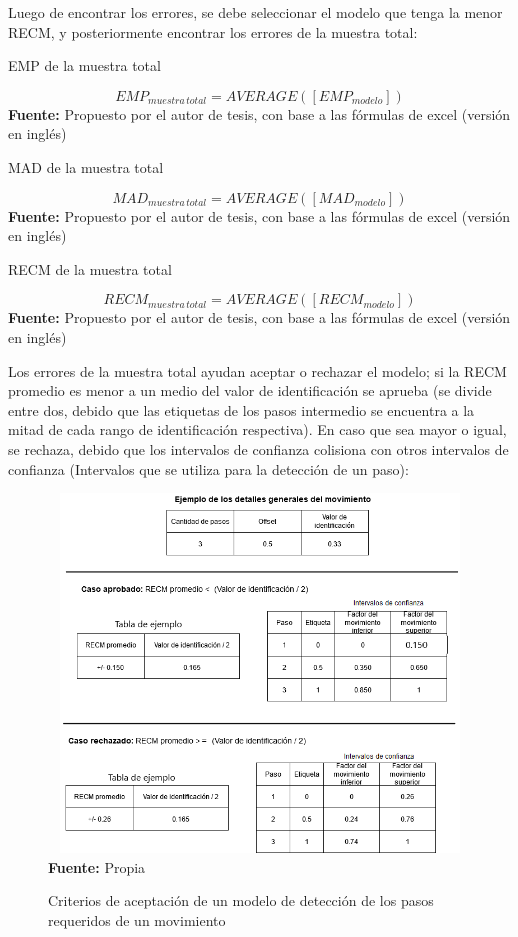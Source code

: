 Luego de encontrar los errores, se debe seleccionar el modelo que tenga la menor \acrshort{RECM}, y posteriormente encontrar los errores de la muestra total:
 \begin{formula}[H]
	\centering
	\caption{EMP de la muestra total}
	\label{frm:EmpAll}
	\begin{equation}
EMP_{muestra\, total}=AVERAGE([EMP_{modelo}])
	\end{equation}
	\textbf{Fuente:} Propuesto por el autor de tesis, con base a las f\'ormulas de excel (versi\'on en ingl\'es)
\end{formula}  
 \begin{formula}[H]
	\centering
	\caption{MAD de la muestra total}
	\label{frm:MadAll}
	\begin{equation}
MAD_{muestra\, total}=AVERAGE([MAD_{modelo}])
	\end{equation}
	\textbf{Fuente:} Propuesto por el autor de tesis, con base a las f\'ormulas de excel (versi\'on en ingl\'es)
\end{formula}  
	 \begin{formula}[H]
	\centering
	\caption{RECM de la muestra total}
	\label{frm:RecmAll}
	\begin{equation}
RECM_{muestra\, total}=AVERAGE([RECM_{modelo}])
	\end{equation}
	\textbf{Fuente:} Propuesto por el autor de tesis, con base a las f\'ormulas de excel (versi\'on en ingl\'es)
\end{formula} 
Los errores de la muestra total ayudan aceptar o rechazar el modelo; si la \acrshort{RECM} promedio  es menor a un medio del valor de identificaci\'on se aprueba (se divide entre dos, debido que las etiquetas de los pasos intermedio se encuentra a la mitad de cada rango de identificaci\'on respectiva). En caso que sea mayor o igual, se rechaza, debido que los intervalos de confianza colisiona con otros intervalos de confianza (Intervalos que se utiliza para la detecci\'on de un paso):
\begin{figure}[H]
	\caption{Criterios de aceptaci\'on de un modelo de detecci\'on de los pasos requeridos de un movimiento}
	\label{fig:AproveOrDennie}
	\centering
	\includegraphics[width=430px,height=360px]{graphics/CriterioAceptacion.png} \\
	\textbf{Fuente:} Propia
\end{figure}
